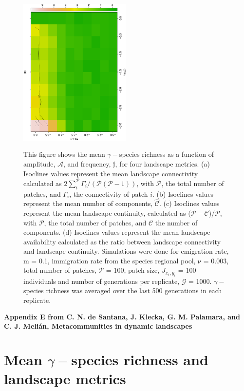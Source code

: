 \documentclass[12pt]{article}
\begin{document}
\begin{figure}[hb!]
\begin{center}
\includegraphics[width=2.2in, angle=-90]{./figures/Figure6_Mean_d_003.eps}\\

\end{center}
\caption{This figure shows the mean $\gamma-$species richness as a function of amplitude, $\mathcal{A}$, and frequency, $\mathfrak{f}$, for four landscape metrics. (a) Isoclines values represent the mean landscape connectivity calculated as $2\sum_{i}^{\mathcal{P}} \Gamma_{i}/(\mathcal{P}(\mathcal{P} - 1))$, with $\mathcal{P}$, the total number of patches, and $\Gamma_{i}$, the connectivity of patch $i$. (b) Isoclines values represent the mean number of components, $\hat{\mathcal{C}}$. (c) Isoclines values represent the mean landscape continuity, calculated as ($\mathcal{P} - \mathcal{C}$)/$\mathcal{P}$, with $\mathcal{P}$, the total number of patches, and $\mathcal{C}$ the number of components. (d) Isoclines values represent the mean landscape availability calculated as the ratio between landscape connectivity and landscape continuity. Simulations were done for emigration rate, $\mathrm{m}$ = 0.1, immigration rate from the species regional pool, $\mathrm{\nu}$ = 0.003, total number of patches, $\mathcal{P}$ = 100, patch size, $J_{x_i,y_i}$ = 100 individuals and number of generations per replicate, $\mathcal{G}$ = 1000. $\gamma-$species richness was averaged over the last 500 generations in each replicate.}
\label{fig:SI-D1}
\end{figure}

\clearpage
\begin{flushleft} 
{\Large \textbf{Appendix E from C. N. de Santana, J. Klecka, G. M. Palamara, and C. J. Meli\'{a}n, Metacommunities in dynamic landscapes}}
\section*{Mean $\gamma-$species richness and landscape metrics}
\end{flushleft}
\renewcommand{\theequation}{E-\arabic{equation}}
\setcounter{equation}{0}
\renewcommand{\thesection}{E\arabic{section}}
\renewcommand{\thefigure}{E\arabic{figure}}
\renewcommand{\thetable}{E\arabic{table}}
\setcounter{figure}{0}
\setcounter{table}{0}
\end{document}
